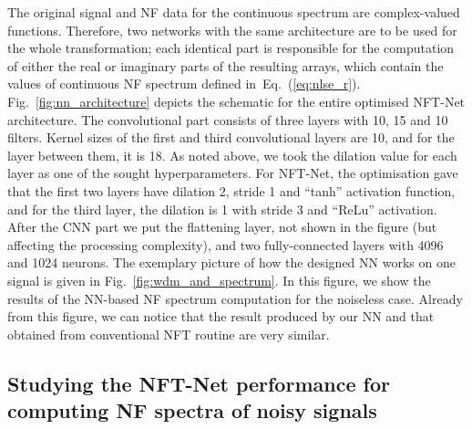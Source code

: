 
The original signal and NF data for the continuous spectrum are complex-valued functions. Therefore, two networks with the same architecture are to be used for the whole transformation; each identical part is responsible for the computation of either the real or imaginary parts of the resulting arrays, which contain the values of continuous NF spectrum defined in~Eq.~(\ref{eq:nlse_r}).  Fig.~\ref{fig:nn_architecture} depicts the schematic for the entire optimised NFT-Net architecture. The convolutional part consists of three layers with 10, 15 and 10 filters. Kernel sizes of the first and third convolutional layers are 10, and for the layer between them, it is 18. As noted above, we took the dilation value for each layer as one of the sought hyperparameters. For NFT-Net, the optimisation gave that the first two layers have dilation 2, stride 1 and ``tanh'' activation function, and for the third layer, the dilation is 1 with stride 3 and ``ReLu''  activation. After the CNN part we put the flattening layer, not shown in the figure (but affecting the processing complexity), and two fully-connected layers with 4096 and 1024 neurons. The exemplary picture of how the designed NN works on one signal is given in Fig.~\ref{fig:wdm_and_spectrum}. In this figure, we show the results of the NN-based NF spectrum computation for the noiseless case. Already from this figure, we can notice that the result produced by our NN and that obtained from conventional NFT routine\cite{FNFT2018} are very similar. 


\subsection{Studying the NFT-Net performance for computing NF spectra of noisy signals}

